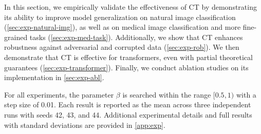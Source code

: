 In this section, we empirically validate the effectiveness of CT by demonstrating its ability to improve model generalization on natural image classification (\cref{sec:exp-natural-img}), as well as on medical image classification and more fine-grained tasks (\cref{sec:exp-med-task}). Additionally, we show that CT enhances robustness against adversarial and corrupted data (\cref{sec:exp-rob}). We then demonstrate that CT is effective for transformers, even with partial theoretical guarantees (\cref{sec:exp-transformer}). Finally, we conduct ablation studies on its implementation in \cref{sec:exp-abl}.

For all experiments, the parameter $\beta$ is searched within the range $[0.5, 1)$ with a step size of 0.01. Each result is reported as the mean across three independent runs with seeds 42, 43, and 44. Additional experimental details and full results with standard deviations are provided in \cref{app:exp}.

